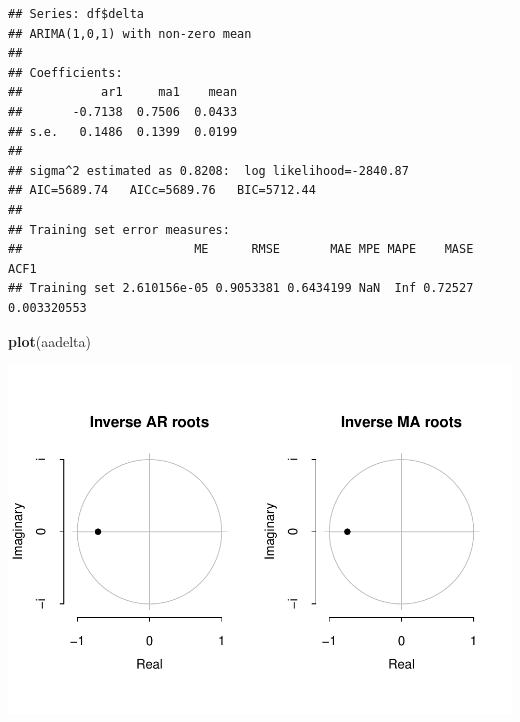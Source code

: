 \documentclass[11pt, a4paper]{report}
\newenvironment{Shaded}{\begin{snugshade}}{\end{snugshade}}
\newcommand{\KeywordTok}[1]{\textcolor[rgb]{0.13,0.29,0.53}{\textbf{#1}}}
\newcommand{\NormalTok}[1]{#1}
\newcommand{\OperatorTok}[1]{\textcolor[rgb]{0.81,0.36,0.00}{\textbf{#1}}}
\theoremstyle{plain}
\theoremstyle{plain}
\theoremstyle{remark}
\begin{document}
\begin{verbatim}
## Series: df$delta 
## ARIMA(1,0,1) with non-zero mean 
## 
## Coefficients:
##           ar1     ma1    mean
##       -0.7138  0.7506  0.0433
## s.e.   0.1486  0.1399  0.0199
## 
## sigma^2 estimated as 0.8208:  log likelihood=-2840.87
## AIC=5689.74   AICc=5689.76   BIC=5712.44
## 
## Training set error measures:
##                        ME      RMSE       MAE MPE MAPE    MASE        ACF1
## Training set 2.610156e-05 0.9053381 0.6434199 NaN  Inf 0.72527 0.003320553
\end{verbatim}

\begin{Shaded}
\begin{Highlighting}[]
\KeywordTok{plot}\NormalTok{(aadelta)}
\end{Highlighting}
\end{Shaded}

\begin{center}\includegraphics{Econo2_P1_files/figure-latex/auto arima-1} \end{center}

\begin{Shaded}
\end{Shaded}
\end{document}
